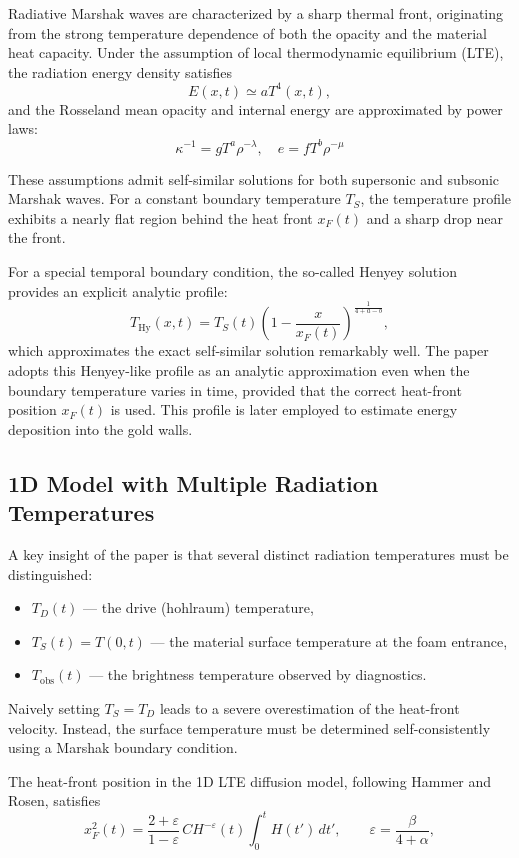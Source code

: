 \documentclass{article}
\begin{document}
Radiative Marshak waves are characterized by a sharp thermal front,
originating from the strong temperature dependence of both the opacity
and the material heat capacity.
Under the assumption of local thermodynamic equilibrium (LTE),
the radiation energy density satisfies
\[
E(x,t) \simeq a T^4(x,t),
\]
and the Rosseland mean opacity and internal energy
are approximated by power laws:
\[
\kappa^{-1} = g T^a \rho^{-\lambda}, \quad
e = f T^b \rho^{-\mu}
\]

These assumptions admit self-similar solutions for both supersonic
and subsonic Marshak waves.
For a constant boundary temperature $T_S$,
the temperature profile exhibits a nearly flat region
behind the heat front $x_F(t)$ and a sharp drop near the front.

For a special temporal boundary condition,
the so-called Henyey solution provides an explicit analytic profile:
\[
T_{\mathrm{Hy}}(x,t) = T_S(t)
\left(1 - \frac{x}{x_F(t)}\right)^{\frac{1}{4+a-b}},
\]
which approximates the exact self-similar solution remarkably well.
The paper adopts this Henyey-like profile as an analytic approximation
even when the boundary temperature varies in time,
provided that the correct heat-front position $x_F(t)$ is used. This profile is later employed to estimate energy deposition into the gold walls.

\subsection{1D Model with Multiple Radiation Temperatures}

A key insight of the paper is that several distinct radiation temperatures
must be distinguished:
\begin{itemize}
\item $T_D(t)$ --- the drive (hohlraum) temperature,
\item $T_S(t) = T(0,t)$ --- the material surface temperature at the foam entrance,
\item $T_{\mathrm{obs}}(t)$ --- the brightness temperature observed by diagnostics.
\end{itemize}

Naively setting $T_S = T_D$ leads to a severe overestimation
of the heat-front velocity.
Instead, the surface temperature must be determined self-consistently
using a Marshak boundary condition.

The heat-front position in the 1D LTE diffusion model,
following Hammer and Rosen, satisfies
\[
x_F^2(t)
= \frac{2+\varepsilon}{1-\varepsilon}\,
CH^{-\varepsilon}(t)\int_0^t H(t')\,dt',
\qquad
\varepsilon = \frac{\beta}{4+\alpha},
\]
\end{document}
